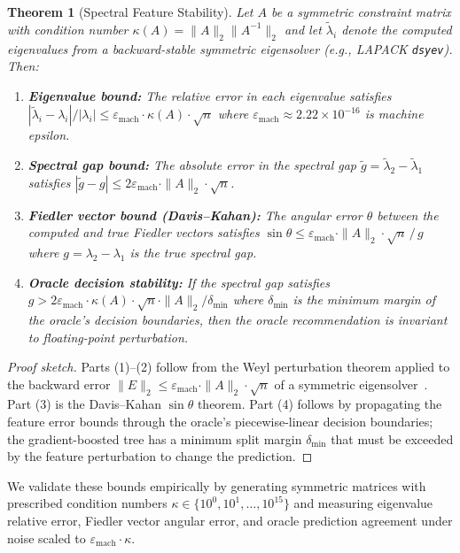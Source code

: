 \documentclass[11pt]{article}
\newtheorem{theorem}{Theorem}
\begin{document}
\begin{theorem}[Spectral Feature Stability]
\label{thm:spectral-stability}
Let $A$ be a symmetric constraint matrix with condition number
$\kappa(A) = \|A\|_2\|A^{-1}\|_2$ and let $\tilde{\lambda}_i$ denote the
computed eigenvalues from a backward-stable symmetric eigensolver (e.g.,
LAPACK \texttt{dsyev}). Then:
\begin{enumerate}[leftmargin=*]
\item \textbf{Eigenvalue bound:} The relative error in each eigenvalue satisfies
  $|\tilde{\lambda}_i - \lambda_i|/|\lambda_i| \leq \varepsilon_{\mathrm{mach}} \cdot \kappa(A) \cdot \sqrt{n}$
  where $\varepsilon_{\mathrm{mach}} \approx 2.22 \times 10^{-16}$ is machine epsilon.
\item \textbf{Spectral gap bound:} The absolute error in the spectral gap
  $\tilde{g} = \tilde{\lambda}_2 - \tilde{\lambda}_1$ satisfies
  $|\tilde{g} - g| \leq 2\varepsilon_{\mathrm{mach}} \cdot \|A\|_2 \cdot \sqrt{n}$.
\item \textbf{Fiedler vector bound (Davis--Kahan):} The angular error $\theta$
  between the computed and true Fiedler vectors satisfies
  $\sin\theta \leq \varepsilon_{\mathrm{mach}} \cdot \|A\|_2 \cdot \sqrt{n}\,/\,g$
  where $g = \lambda_2 - \lambda_1$ is the true spectral gap.
\item \textbf{Oracle decision stability:} If the spectral gap satisfies
  $g > 2\varepsilon_{\mathrm{mach}} \cdot \kappa(A) \cdot \sqrt{n} \cdot \|A\|_2 / \delta_{\min}$
  where $\delta_{\min}$ is the minimum margin of the oracle's decision boundaries,
  then the oracle recommendation is invariant to floating-point perturbation.
\end{enumerate}
\end{theorem}

\begin{proof}[Proof sketch]
Parts (1)--(2) follow from the Weyl perturbation theorem applied to the
backward error $\|E\|_2 \leq \varepsilon_{\mathrm{mach}} \cdot \|A\|_2 \cdot \sqrt{n}$
of a symmetric eigensolver~\cite{demmel1997}. Part (3) is the Davis--Kahan
$\sin\theta$ theorem. Part (4) follows by propagating the feature error bounds
through the oracle's piecewise-linear decision boundaries; the gradient-boosted
tree has a minimum split margin $\delta_{\min}$ that must be exceeded by the
feature perturbation to change the prediction.
\end{proof}

We validate these bounds empirically by generating symmetric matrices with
prescribed condition numbers $\kappa \in \{10^0, 10^1, \ldots, 10^{15}\}$
and measuring eigenvalue relative error, Fiedler vector angular error,
and oracle prediction agreement under noise scaled to $\varepsilon_{\mathrm{mach}} \cdot \kappa$.
\end{document}
